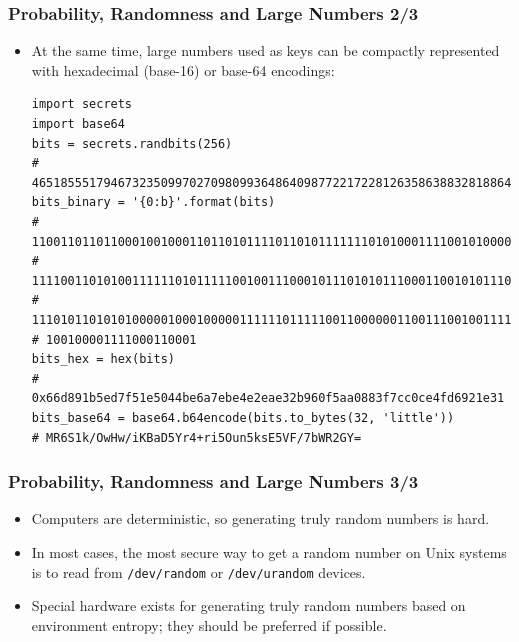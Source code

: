 \documentclass{beamer}
\begin{document}
\begin{frame}[fragile]
  \frametitle{Probability, Randomness and Large Numbers 2/3}
  \begin{itemize}
  \item At the same time, large numbers used as keys can be compactly
    represented with hexadecimal (base-16) or base-64 encodings:
\begin{verbatim}
import secrets
import base64
bits = secrets.randbits(256)
# 46518555179467323509970270980993648640987722172281263586388328188640792550961
bits_binary = '{0:b}'.format(bits)
# 110011011011000100100011011010111101101011111110101000111100101000001000100101\
# 111100110101001111110101111100100111000101110101011100011001010111001011000001\
# 111010110101010000010001000001111110111110011000000110011100100111111010110100\
# 100100001111000110001
bits_hex = hex(bits)
# 0x66d891b5ed7f51e5044be6a7ebe4e2eae32b960f5aa0883f7cc0ce4fd6921e31
bits_base64 = base64.b64encode(bits.to_bytes(32, 'little'))
# MR6S1k/OwHw/iKBaD5Yr4+ri5Oun5ksE5VF/7bWR2GY=
\end{verbatim}
  \end{itemize}
\end{frame}

\begin{frame}[fragile]
  \frametitle{Probability, Randomness and Large Numbers 3/3}
  \begin{itemize}
  \item Computers are deterministic, so generating truly random numbers is hard.
  \item In most cases, the most secure way to get a random number on Unix
    systems is to read from \texttt{/dev/random} or
    \texttt{/dev/urandom} devices.
  \item Special hardware exists for generating truly random numbers based on
    environment entropy; they should be preferred if possible.
  \end{itemize}
\end{frame}
\end{document}
